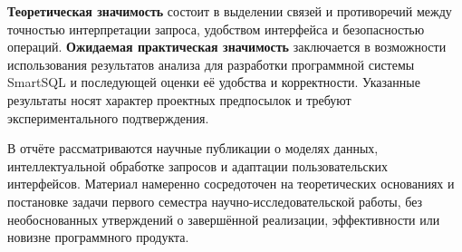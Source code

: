 \textbf{Теоретическая значимость} состоит в выделении связей и противоречий между точностью интерпретации запроса, удобством интерфейса и безопасностью операций. \textbf{Ожидаемая практическая значимость} заключается в возможности использования результатов анализа для разработки программной системы SmartSQL и последующей оценки её удобства и корректности. Указанные результаты носят характер проектных предпосылок и требуют экспериментального подтверждения.

В отчёте рассматриваются научные публикации о моделях данных, интеллектуальной обработке запросов и адаптации пользовательских интерфейсов. Материал намеренно сосредоточен на теоретических основаниях и постановке задачи первого семестра научно-исследовательской работы, без необоснованных утверждений о завершённой реализации, эффективности или новизне программного продукта.